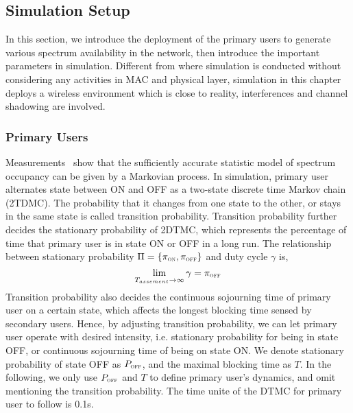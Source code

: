 \subsection{Simulation Setup}
In this section, we introduce the deployment of the primary users to generate various spectrum availability in the network, then introduce the important parameters in simulation.
Different from \cite{gpsfree05infocom} where simulation is conducted without considering any activities in MAC and physical layer, simulation in this chapter deploys a wireless environment which is close to reality, \eg interferences and channel shadowing are involved.


\subsubsection{Primary Users}
Measurements~\cite{ProbabilityAndComputing, dsa_model_markov_2006} show that the sufficiently accurate statistic model of spectrum occupancy can be given by a Markovian process.
In simulation, primary user alternates state between ON and OFF as a two-state discrete time Markov chain (\gls{2TDMC}).
The probability that it changes from one state to the other, or stays in the same state is called transition probability.
Transition probability further decides the stationary probability of 2DTMC, which represents the percentage of time that primary user is in state ON or OFF in a long run.
The relationship between stationary probability $\Pi=\{\pi_{\textsc{\tiny ON}}, \pi_{\textsc{\tiny OFF}}\}$ and duty cycle $\gamma$ is, 
\begin{equation}
\label{stationary_probability}
\lim\limits_{T_{assement} \to \infty }{\gamma} = \pi_{\textsc{\tiny OFF}}
\end{equation}
Transition probability also decides the continuous sojourning time of primary user on a certain state, which affects the longest blocking time sensed by secondary users.
Hence, by adjusting transition probability, we can let primary user operate with desired intensity, i.e. stationary probability for being in state OFF, or continuous sojourning time of being on state ON.
We denote stationary probability of state OFF as $P_{\textsc{\tiny OFF}}$, and the maximal blocking time as $T$.
In the following, we only use $P_{\textsc{\tiny OFF}}$ and $T$ to define primary user's dynamics, and omit mentioning the transition probability.
The time unite of the DTMC for primary user to follow is 0.1s.

